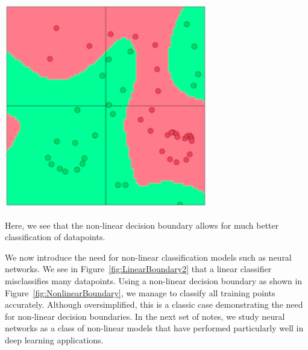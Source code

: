 \documentclass{tufte-handout}
\begin{document}
\begin{marginfigure}%
  \includegraphics[width = \linewidth]{NonlinearBoundary}
  \caption{Here, we see that the non-linear decision boundary allows for much better classification of datapoints.}
    \label{fig:NonlinearBoundary}
\end{marginfigure}

We now introduce the need for non-linear classification models such as neural networks. We see in Figure~\ref{fig:LinearBoundary2} that a linear classifier misclassifies many datapoints. Using a non-linear decision boundary as shown in Figure~\ref{fig:NonlinearBoundary}, we manage to classify all training points accurately. Although oversimplified, this is a classic case demonstrating the need for non-linear decision boundaries. In the next set of notes, we study neural networks as a class of non-linear models that have performed particularly well in deep learning applications.
\end{document}
